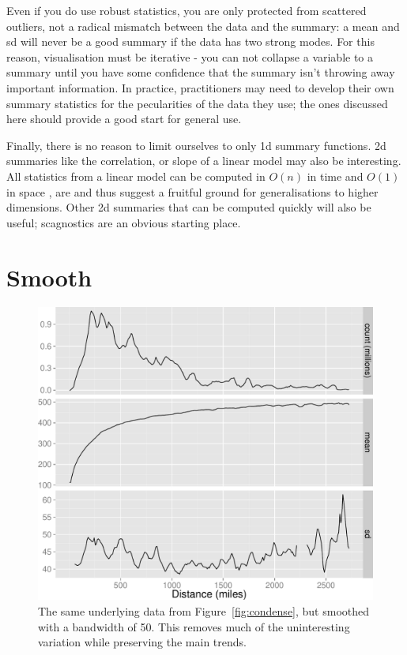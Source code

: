 \documentclass[journal]{vgtc}                %
\begin{document}

Even if you do use robust statistics, you are only protected from scattered outliers, not a radical mismatch between the data and the summary: a mean and sd will never be a good summary if the data has two strong modes. For this reason, visualisation must be iterative - you can not collapse a variable to a summary until you have some confidence that the summary isn't throwing away important information. In practice, practitioners may need to develop their own summary statistics for the pecularities of the data they use; the ones discussed here should provide a good start for general use.

Finally, there is no reason to limit ourselves to only 1d summary functions. 2d summaries like the correlation, or slope of a linear model may also be interesting. All statistics from a linear model can be computed in $O(n)$ in time and $O(1)$ in space \citep{miller:1992}, are and thus suggest a fruitful ground for generalisations to higher dimensions. Other 2d summaries that can be computed quickly will also be useful; scagnostics \citep{wilkinson:2005} are an obvious starting place.

\section{Smooth}
\label{sec:smooth}

\begin{figure}[htb]
 \centering
 \includegraphics[width=\linewidth]{smooth}
 \caption{The same underlying data from Figure~\ref{fig:condense}, but smoothed with a bandwidth of 50. This removes much of the uninteresting variation while preserving the main trends.}
 \label{fig:smooth}
\end{figure}
\end{document}
